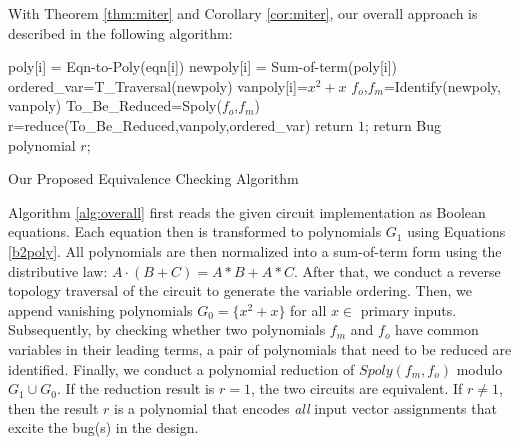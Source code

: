 With Theorem \ref{thm:miter} and Corollary \ref{cor:miter}, our overall approach is described in the following algorithm:


\begin{algorithm}[hbt]
\SetAlgoNoLine


  	{
  		poly[i] = Eqn-to-Poly(eqn[i])\;
  		newpoly[i] = Sum-of-term(poly[i])\;
	}
ordered\_var=T\_Traversal(newpoly)\;
	{
    	vanpoly[i]=$x^2+x$\;
	}    
{$f_{o}$,$f_{m}$}=Identify(newpoly, vanpoly)\;
To\_Be\_Reduced=Spoly($f_{o}$,$f_{m}$)\;
r=reduce(To\_Be\_Reduced,vanpoly,ordered\_var)\;
   {
   	 return $1$;
   }
   {
   	 return Bug polynomial $r$; %
   }	 

\caption{Our Proposed Equivalence Checking Algorithm}\label{alg:ecall}
\end{algorithm}


Algorithm \ref{alg:overall} first reads the given circuit implementation as Boolean
equations. Each equation then is transformed to polynomials $G_1$ using Equations \ref{b2poly}.  
All polynomials are then normalized into a sum-of-term form using the distributive law: $A\cdot(B+C)=A*B+A*C$. 
After that, we conduct a reverse topology traversal of
the circuit to generate the variable ordering. Then, we append
vanishing polynomials $G_{0} =\{x^2 + x \}$ for all $x \in$ primary inputs. 
Subsequently, by checking whether two polynomials $f_{m}$ and $f_{o}$ have common variables in their leading terms, 
a pair of polynomials that need to be reduced are identified. 
Finally, we conduct a polynomial reduction of $Spoly(f_{m},f_{o})$  modulo $G_1 \cup G_{0}$. 
If the reduction result is $r = 1$, the two circuits are equivalent.
If $r \neq 1$, then the result $r$ is a polynomial that encodes {\it all} input vector
assignments that excite the bug(s) in the design. 


